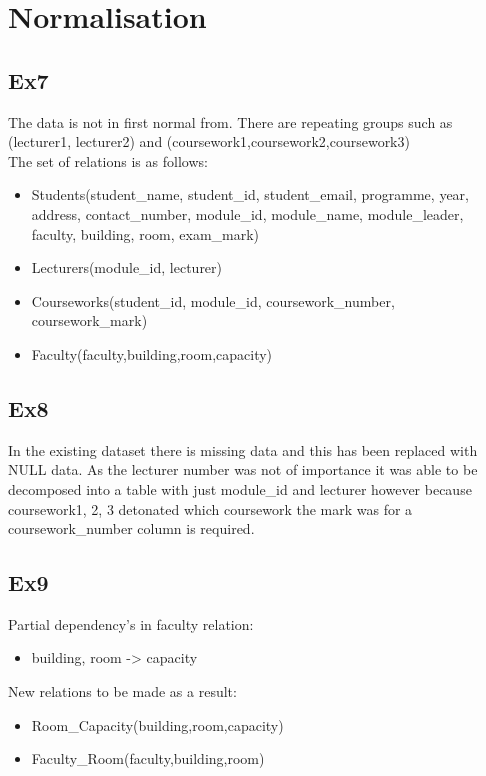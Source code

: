 \documentclass{article}
\begin{document}
\section{Normalisation}
\subsection{Ex7}
The data is not in first normal from. There are repeating groups such as (lecturer1, lecturer2) and (coursework1,coursework2,coursework3)\\

\noindent
The set of relations is as follows:
\begin{itemize}
    \item Students(student\_name, student\_id, student\_email, programme, year, address, contact\_number, module\_id, module\_name, module\_leader, faculty, building, room, exam\_mark)
    \item Lecturers(module\_id, lecturer)
    \item Courseworks(student\_id, module\_id, coursework\_number, coursework\_mark)
    \item Faculty(faculty,building,room,capacity)
\end{itemize}

\subsection{Ex8}
In the existing dataset there is missing data and this has been replaced with NULL data. As the lecturer number was not of importance it was able to be decomposed into a table with just module\_id and lecturer however because coursework1, 2, 3 detonated which coursework the mark was for a coursework\_number column is required.

\subsection{Ex9}


Partial dependency's in faculty relation:
\begin{itemize}
    \item building, room -> capacity
\end{itemize}

\noindent
New relations to be made as a result:
\begin{itemize}
    \item Room\_Capacity(building,room,capacity)
    \item Faculty\_Room(faculty,building,room)
\end{itemize}
\end{document}
